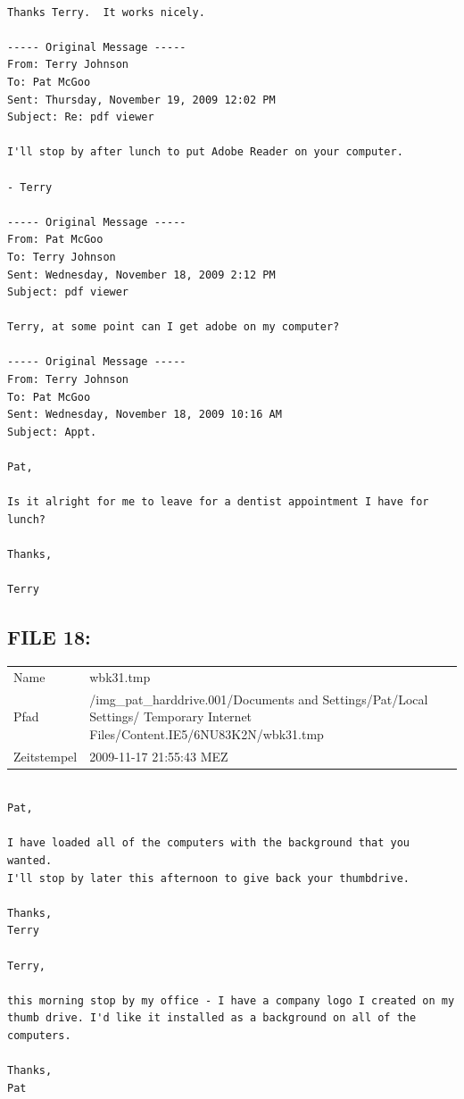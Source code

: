 \begin{lstlisting}

Thanks Terry.  It works nicely.

----- Original Message -----
From: Terry Johnson
To: Pat McGoo
Sent: Thursday, November 19, 2009 12:02 PM
Subject: Re: pdf viewer

I'll stop by after lunch to put Adobe Reader on your computer.

- Terry

----- Original Message -----
From: Pat McGoo
To: Terry Johnson
Sent: Wednesday, November 18, 2009 2:12 PM
Subject: pdf viewer

Terry, at some point can I get adobe on my computer?

----- Original Message -----
From: Terry Johnson
To: Pat McGoo
Sent: Wednesday, November 18, 2009 10:16 AM
Subject: Appt.

Pat,

Is it alright for me to leave for a dentist appointment I have for
lunch?

Thanks,

Terry
\end{lstlisting}

\subsection{FILE 18:}
\label{sec:pat_emails_18}

\begin{table}[htb]
	\begin{tabular}{p{2cm} p{13.5cm}}
		Name & wbk31.tmp\\
		Pfad & /img_pat_harddrive.001/Documents and Settings/Pat/Local Settings/ Temporary Internet Files/Content.IE5/6NU83K2N/wbk31.tmp\\
		Zeitstempel & 2009-11-17 21:55:43 MEZ
	\end{tabular}
\end{table}	

\begin{lstlisting}

Pat,

I have loaded all of the computers with the background that you wanted. 
I'll stop by later this afternoon to give back your thumbdrive.

Thanks,
Terry

Terry,

this morning stop by my office - I have a company logo I created on my
thumb drive. I'd like it installed as a background on all of the
computers.

Thanks,
Pat
\end{lstlisting}

